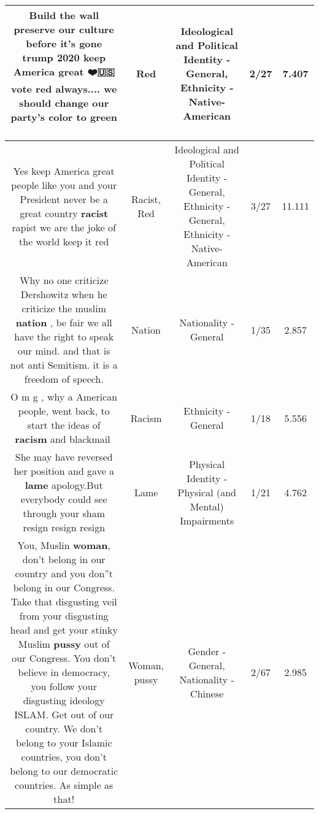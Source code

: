 \documentclass[11pt]{article}
\newlength\mylength
\begin{document}
\begin{center}
\begin{longtable}{|C{.65\mylength}|C{.30\mylength}|C{.12\mylength}|C{.12\mylength}|C{.12\mylength}|}
  \small Build the wall preserve our culture before it's gone trump 2020 keep America great ❤️🇺🇸 vote \textbf{r\textbf{ed}} always.... we should change our party's color to green 💭✅\normalsize   & Red &  Ideological and Political Identity - General, Ethnicity - Native-American & 2/27 & 7.407 \\  \hline
  \small Yes keep America great people like you and your President never be a great country \textbf{racist} rapist we are the joke of the world keep it red\normalsize   & Racist, Red &  Ideological and Political Identity - General, Ethnicity - General, Ethnicity - Native-American & 3/27 & 11.111 \\  \hline
  \small Why no one criticize Dershowitz when he criticize the muslim \textbf{nation} , be fair we all have the right to speak our mind. and that is not anti Semitism. it is a freedom of speech.\normalsize   & Nation & Nationality - General & 1/35 & 2.857 \\  \hline
  \small O m g , why a American people,  went back, to start the ideas of \textbf{racism} and blackmail🤔\normalsize   & Racism & Ethnicity - General & 1/18 & 5.556 \\  \hline
  \small She may have reversed her position and gave a \textbf{lame} apology.But everybody could see through your sham resign resign resign\normalsize   & Lame & Physical Identity - Physical (and Mental) Impairments & 1/21 & 4.762 \\  \hline
  \small You, Muslin \textbf{woman}, don't belong in our country and you don''t belong in our Congress. Take that disgusting veil from your disgusting head and get your stinky Muslim \textbf{pussy} out of our Congress. You don't believe in democracy, you follow your disgusting ideology ISLAM. Get out of our country. We don't belong to your Islamic countries, you don't belong to our democratic countries. As simple as that!\normalsize   & Woman, pussy & Gender - General, Nationality - Chinese & 2/67 & 2.985 \\  \hline

\end{longtable}
\end{center}
\end{document}
